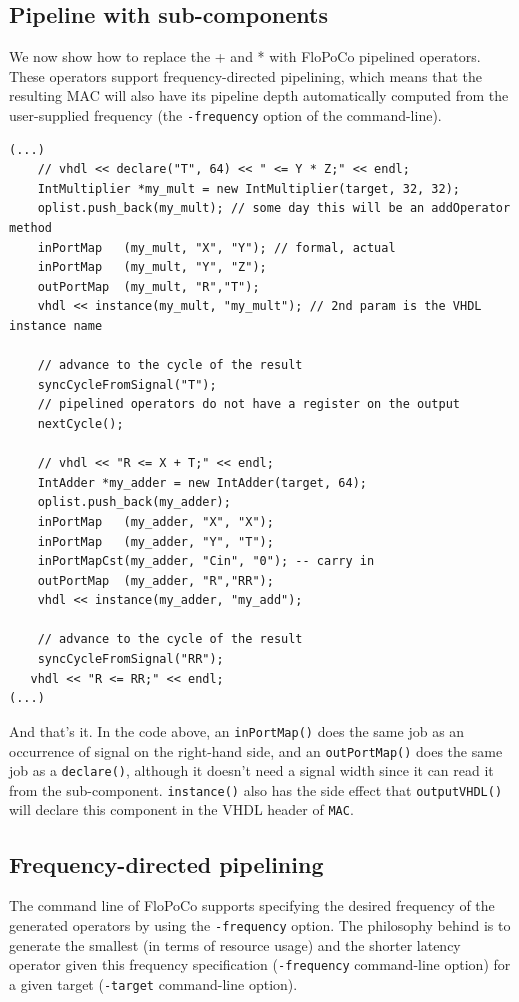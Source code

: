 \documentclass{article}
\begin{document}
\subsection{Pipeline with sub-components}

We now show how to replace the + and * with FloPoCo pipelined
operators. These operators support frequency-directed pipelining,
which means that the resulting MAC will also have its pipeline depth
automatically computed from the user-supplied frequency (the
\texttt{-frequency} option of the command-line).

\begin{verbatim}
(...)
	// vhdl << declare("T", 64) << " <= Y * Z;" << endl;
	IntMultiplier *my_mult = new IntMultiplier(target, 32, 32);
	oplist.push_back(my_mult); // some day this will be an addOperator method
	inPortMap   (my_mult, "X", "Y"); // formal, actual
	inPortMap   (my_mult, "Y", "Z");
	outPortMap  (my_mult, "R","T");
	vhdl << instance(my_mult, "my_mult"); // 2nd param is the VHDL instance name

	// advance to the cycle of the result
	syncCycleFromSignal("T"); 
	// pipelined operators do not have a register on the output 
	nextCycle();

	// vhdl << "R <= X + T;" << endl;
	IntAdder *my_adder = new IntAdder(target, 64);
	oplist.push_back(my_adder);
	inPortMap   (my_adder, "X", "X");
	inPortMap   (my_adder, "Y", "T");
	inPortMapCst(my_adder, "Cin", "0"); -- carry in
	outPortMap  (my_adder, "R","RR");
	vhdl << instance(my_adder, "my_add");

	// advance to the cycle of the result
	syncCycleFromSignal("RR"); 
   vhdl << "R <= RR;" << endl; 
(...)
\end{verbatim}


And that's it. In the code above, an \verb!inPortMap()! does the same
job as an occurrence of signal on the right-hand side, and an
\verb!outPortMap()! does the same job as a \verb!declare()!, although
it doesn't need a signal width since it can read it from the
sub-component. \verb!instance()! also has the side effect that
\verb!outputVHDL()! will declare this component in the VHDL header of
\verb!MAC!.


\subsection{Frequency-directed pipelining}
\label{sec:finegrain}

The command line of FloPoCo supports specifying the desired frequency
of the generated operators by using the \verb!-frequency! option. The
philosophy behind is to generate the smallest (in terms of resource
usage) and the shorter latency operator given this frequency
specification (\texttt{-frequency} command-line option) for a given
target (\texttt{-target} command-line option).
\end{document}
